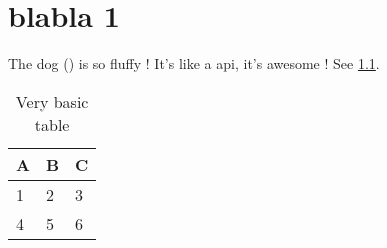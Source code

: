 \chapter{blabla 1}
\label{chp:\thechapter}


The dog () is so fluffy !
It's like a \gls{api}, it's awesome ! See \cref{tab:abc}.

\begin{table}[h]
    \centering
    \begin{tabular}{l | l | l}
        A & B & C \\
        \hline
        1 & 2 & 3 \\
        4 & 5 & 6
    \end{tabular}
    \caption{Very basic table}
    \label{tab:abc}
\end{table}

\lipsum[1-20]